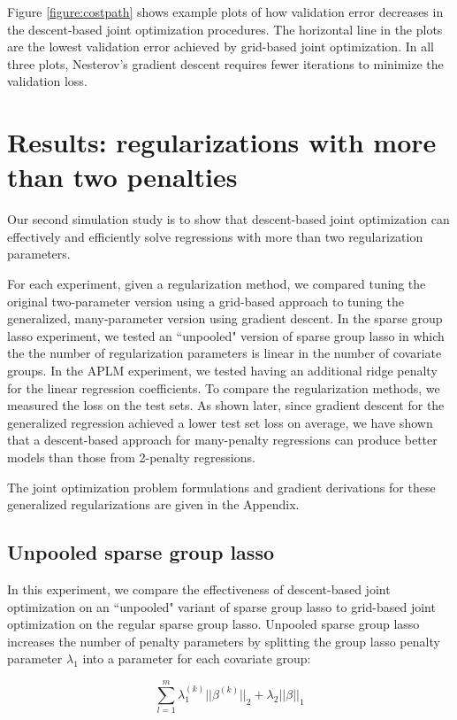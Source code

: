 \documentclass[10pt,letterpaper]{article}
\begin{document}
Figure \ref{figure:costpath} shows example plots of how validation error decreases in the descent-based joint optimization procedures. The horizontal line in the plots are the lowest validation error achieved by grid-based joint optimization. In all three plots, Nesterov's gradient descent requires fewer iterations to minimize the validation loss.

\section{Results: regularizations with more than two penalties}

Our second simulation study is to show that descent-based joint optimization can effectively and efficiently solve regressions with more than two regularization parameters.

For each experiment, given a regularization method, we compared tuning the original two-parameter version using a grid-based approach to tuning the generalized, many-parameter version using gradient descent. In the sparse group lasso experiment, we tested an ``unpooled" version of sparse group lasso in which the the number of regularization parameters is linear in the number of covariate groups. In the APLM experiment, we tested having an additional ridge penalty for the linear regression coefficients. To compare the regularization methods, we measured the loss on the test sets. As shown later, since gradient descent for the generalized regression achieved a lower test set loss on average, we have shown that a descent-based approach for many-penalty regressions can produce better models than those from 2-penalty regressions.

The joint optimization problem formulations and gradient derivations for these generalized regularizations are given in the Appendix.

\subsection{Unpooled sparse group lasso}

In this experiment, we compare the effectiveness of descent-based joint optimization on an ``unpooled" variant of sparse group lasso to grid-based joint optimization on the regular sparse group lasso. Unpooled sparse group lasso increases the number of penalty parameters by splitting the group lasso penalty parameter $\lambda_1$ into a parameter for each covariate group:

\begin{equation}
\sum_{l=1}^m \lambda_1^{(k)} \lvert\lvert \beta^{(k)} \rvert \rvert_2
+ \lambda_2 \lvert\lvert \beta \rvert \rvert_1
\end{equation}
\end{document}
